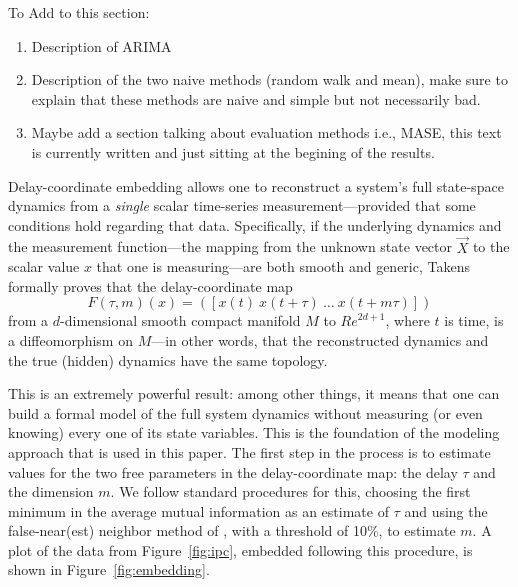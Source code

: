 \documentclass{article}
\begin{document}
To Add to this section:

\begin{enumerate}
\item Description of ARIMA
\item Description of the two naive methods (random walk and mean), make sure to explain that these methods are naive and simple but not necessarily bad.

\item Maybe add a section talking about evaluation methods i.e., MASE, this text is currently written and just sitting at the begining of the results. 

\end{enumerate}




Delay-coordinate embedding allows one to reconstruct a system's full
state-space dynamics from a \emph{single} scalar time-series
measurement---provided that some conditions hold regarding that data.
Specifically, if the underlying dynamics and the measurement
function---the mapping from the unknown state vector $\vec{X}$ to the
scalar value $x$ that one is measuring---are both smooth and generic,
Takens~\cite{takens} formally proves that the delay-coordinate map
\[
F(\tau,m)(x) = ([x(t) ~ x(t+\tau) ~ \dots ~x(t+m\tau)])
\]
from a $d$-dimensional smooth compact manifold $M$ to ${Re}^{2d+1}$,
where $t$ is time, is a diffeomorphism on $M$---in other words, that
the reconstructed dynamics and the true (hidden) dynamics have the
same topology.

This is an extremely powerful result: among other things, it means
that one can build a formal model of the full system dynamics without
measuring (or even knowing) every one of its state variables.  This is
the foundation of the modeling approach that is used in this paper.
The first step in the process is to estimate values for the two free
parameters in the delay-coordinate map: the delay $\tau$ and the
dimension $m$.  We follow standard procedures for this, choosing the
first minimum in the average mutual information as an estimate of
$\tau$ \cite{fraser-swinney} and using the false-near(est) neighbor
method of \cite{KBA92}, with a threshold of 10\%, to estimate $m$.  A
plot of the data from Figure~\ref{fig:ipc}, embedded following this
procedure, is shown in Figure~\ref{fig:embedding}.
\end{document}
